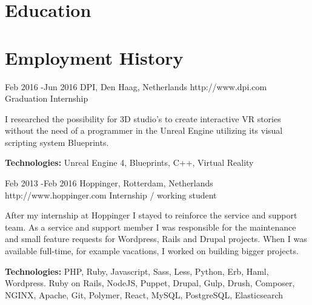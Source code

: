 \documentclass[10pt]{article} %
\begin{document}

\section{Education}





\section{Employment History}

\job
{Feb 2016 -}{Jun 2016}
{DPI, Den Haag, Netherlands}
{http://www.dpi.com}
{Graduation Internship}
{I researched the possibility for 3D studio's to create interactive VR stories without the need of a programmer in the Unreal Engine utilizing its visual scripting system Blueprints.\\
\rule{0mm}{5mm}\textbf{Technologies:} Unreal Engine 4, Blueprints, C++, Virtual Reality}


\job
{Feb 2013 -}{Feb 2016}
{Hoppinger, Rotterdam, Netherlands}
{http://www.hoppinger.com}
{Internship / working student}
{After my internship at Hoppinger I stayed to reinforce the service and support team. As a service and support member I was responsible for the maintenance and small feature requests for Wordpress, Rails and Drupal projects. When I was available full-time, for example vacations, I worked on building bigger projects.

\rule{0mm}{5mm}\textbf{Technologies:} PHP, Ruby, Javascript, Sass, Less, Python, Erb, Haml, Wordpress. Ruby on Rails, NodeJS, Puppet, Drupal, Gulp, Drush, Composer, NGINX, Apache, Git, Polymer, React, MySQL, PostgreSQL, Elasticsearch
}
\end{document}
